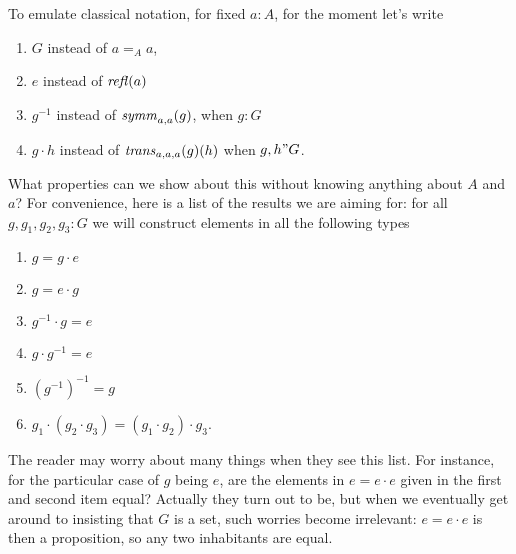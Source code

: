  To emulate classical notation, for fixed $a:A$,  for the moment let's write 
 \begin{enumerate}
 \item $G$ instead of $a=_Aa$,
 \item $e$ instead of $\mathop{{\it refl}}(a)$
 \item $g^{-1}$ instead of $\mathop{{\it symm}}_{a,a}(g)$, when $g:G$
 \item $g\cdot h$ instead of $\mathop{{\it trans}}_{a,a,a}(g)(h)$ when $g,h"G$.
 \end{enumerate}
 What properties can we show about this without knowing anything about $A$ and $a$? For convenience, here is a list of the results we are aiming for: for all $g,g_1,g_2,g_3:G$ we will construct elements in all the following types 
 \begin{enumerate}
 \item $g=g\cdot e$
 \item $g=e\cdot g$
 \item $g^{-1}\cdot g=e$
 \item $g\cdot g^{-1}=e$
 \item $(g^{-1})^{-1}=g$
 \item $g_1\cdot(g_2\cdot g_3)=(g_1\cdot g_2)\cdot g_3$.
 \end{enumerate}
The reader may worry about many things when they see this list.  For instance, for the particular case of $g$ being $e$, are the elements in $e=e\cdot e$ given in the first and second item equal?  Actually they turn out to be, but when we eventually get around to insisting that $G$ is a set, such worries become irrelevant: $e=e\cdot e$ is then a proposition, so any two inhabitants are equal.


